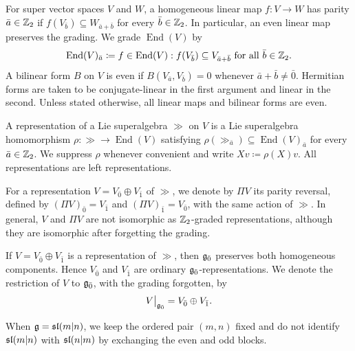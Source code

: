 For super vector spaces $V$ and $W$, a homogeneous linear map $f\colon V\to W$ has parity $\bar{a}\in\ZZ_{2}$ if $f(V_{\bar{b}})\subseteq W_{\bar{a}+\bar{b}}$ for every $\bar{b}\in\ZZ_{2}$. In particular, an even linear map preserves the grading. We grade $\operatorname{End}(V)$ by
\begin{equation}
\operatorname{End}(V)_{\bar{a}}\coloneqq{f\in\operatorname{End}(V):f(V_{\bar{b}})\subseteq V_{\bar{a}+\bar{b}}\text{ for all }\bar{b}\in\ZZ_{2}}.
\end{equation}
A bilinear form $B$ on $V$ is even if $B(V_{\bar{a}},V_{\bar{b}})=0$ whenever $\bar{a}+\bar{b}\neq\bar0$. Hermitian forms are taken to be conjugate-linear in the first argument and linear in the second. Unless stated otherwise, all linear maps and bilinear forms are even. 

A representation of a Lie superalgebra $\gg$ on $V$ is a Lie superalgebra homomorphism $\rho\colon\gg\to\operatorname{End}(V)$ satisfying $\rho(\gg_{\bar{a}})\subseteq\operatorname{End}(V)_{\bar{a}}$ for every $\bar{a}\in\ZZ_{2}$. We suppress $\rho$ whenever convenient and write $Xv\coloneqq\rho(X)v$. All representations are left representations. 

For a representation $V=V_{\bar0}\oplus V_{\bar1}$ of $\gg$, we denote by $\Pi V$ its parity reversal, defined by
$(\Pi V)_{\bar0}=V_{\bar1}$ and $(\Pi V)_{\bar1}=V_{\bar0}$, with the same action of $\gg$. In general, $V$ and $\Pi V$ are not isomorphic as $\ZZ_2$-graded representations, although they are isomorphic after forgetting the grading.

If $V=V_{\bar0}\oplus V_{\bar1}$ is a representation of $\gg$, then $\even$ preserves both homogeneous components. Hence $V_{\bar0}$ and $V_{\bar1}$ are ordinary $\even$-representations. We denote the restriction of $V$ to $\even$, with the grading forgotten, by
\begin{equation}
V\big\vert_{\even}=V_{\bar0}\oplus V_{\bar1}.
\end{equation}

When $\gg=\sl(m\vert n)$, we keep the ordered pair $(m,n)$ fixed and do not identify $\sl(m\vert n)$ with $\sl(n\vert m)$ by exchanging the even and odd blocks.

